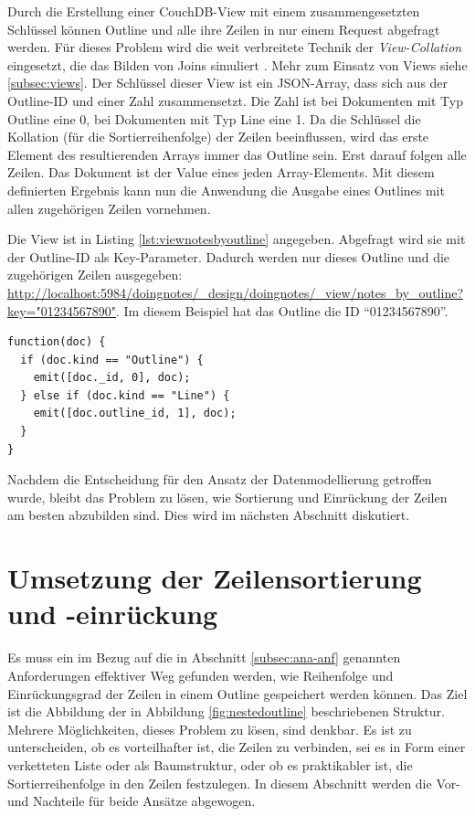Durch die Erstellung einer CouchDB-View mit einem zusammengesetzten Schlüssel können Outline und alle ihre Zeilen in nur einem Request abgefragt werden. Für dieses Problem wird die weit verbreitete Technik der \textit{View-Collation} eingesetzt, die das Bilden von Joins simuliert \cite{couchdb:joins}. Mehr zum Einsatz von Views siehe \ref{subsec:views}. Der Schlüssel dieser View ist ein JSON-Array, dass sich aus der Outline-ID und einer Zahl zusammensetzt. Die Zahl ist bei Dokumenten mit Typ {\selectfont Outline} eine 0, bei Dokumenten mit Typ {\selectfont Line} eine 1. Da die Schlüssel die Kollation (für die Sortierreihenfolge) der Zeilen beeinflussen, wird das erste Element des resultierenden Arrays immer das Outline sein. Erst darauf folgen alle Zeilen. Das Dokument ist der Value eines jeden Array-Elements. Mit diesem definierten Ergebnis kann nun die Anwendung die Ausgabe eines Outlines mit allen zugehörigen Zeilen vornehmen.

Die View ist in Listing \ref{lst:viewnotesbyoutline} angegeben. Abgefragt wird sie mit der Outline-ID als Key-Parameter. Dadurch werden nur dieses Outline und die zugehörigen Zeilen ausgegeben: \url{http://localhost:5984/doingnotes/_design/doingnotes/_view/notes_by_outline?key="01234567890"}. Im diesem Beispiel hat das Outline die ID \enquote{01234567890}. 

\medskip
\begin{lstlisting}[caption=View zum Ausgeben aller Zeilen zu einem Outline, label={lst:viewnotesbyoutline}]
function(doc) {
  if (doc.kind == "Outline") {
    emit([doc._id, 0], doc);
  } else if (doc.kind == "Line") {
    emit([doc.outline_id, 1], doc);
  }
}
\end{lstlisting}

Nachdem die Entscheidung für den Ansatz der Datenmodellierung getroffen wurde, bleibt das Problem zu lösen, wie Sortierung und Einrückung der Zeilen am besten abzubilden sind. Dies wird im nächsten Abschnitt diskutiert.


\section{Umsetzung der Zeilensortierung und -einrückung}
\label{sec:sortierung}

Es muss ein im Bezug auf die in Abschnitt \ref{subsec:ana-anf} genannten Anforderungen effektiver Weg gefunden werden, wie Reihenfolge und Einrückungsgrad der Zeilen in einem Outline gespeichert werden können. Das Ziel ist die Abbildung der in Abbildung \ref{fig:nestedoutline} beschriebenen Struktur. Mehrere Möglichkeiten, dieses Problem zu lösen, sind denkbar. Es ist zu unterscheiden, ob es vorteilhafter ist, die Zeilen zu verbinden, sei es in Form einer verketteten Liste oder als Baumstruktur, oder ob es praktikabler ist, die Sortierreihenfolge in den Zeilen festzulegen. In diesem Abschnitt werden die Vor- und Nachteile für beide Ansätze abgewogen. 

